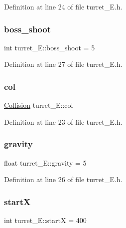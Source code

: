 Definition at line 24 of file turret\+\_\+\+E.\+h.

\hypertarget{classturret___e_aded4c4573a33a16416b58b968219eed3}{}\label{classturret___e_aded4c4573a33a16416b58b968219eed3} 
\subsubsection{\texorpdfstring{boss\+\_\+shoot}{boss\_shoot}}
{\footnotesize\ttfamily int turret\+\_\+\+E\+::boss\+\_\+shoot = 5}



Definition at line 27 of file turret\+\_\+\+E.\+h.

\hypertarget{classturret___e_ad7bd8a3d29a005506463104ef6fb3d3b}{}\label{classturret___e_ad7bd8a3d29a005506463104ef6fb3d3b} 
\subsubsection{\texorpdfstring{col}{col}}
{\footnotesize\ttfamily \hyperlink{class_collision}{Collision} turret\+\_\+\+E\+::col}



Definition at line 23 of file turret\+\_\+\+E.\+h.

\hypertarget{classturret___e_a9fd3b5de655d1e22c7706f5b3022fc81}{}\label{classturret___e_a9fd3b5de655d1e22c7706f5b3022fc81} 
\subsubsection{\texorpdfstring{gravity}{gravity}}
{\footnotesize\ttfamily float turret\+\_\+\+E\+::gravity = 5}



Definition at line 26 of file turret\+\_\+\+E.\+h.

\hypertarget{classturret___e_a49fd9095bd80407fa9aaceb5a397d6ba}{}\label{classturret___e_a49fd9095bd80407fa9aaceb5a397d6ba} 
\subsubsection{\texorpdfstring{startX}{startX}}
{\footnotesize\ttfamily int turret\+\_\+\+E\+::startX = 400}



